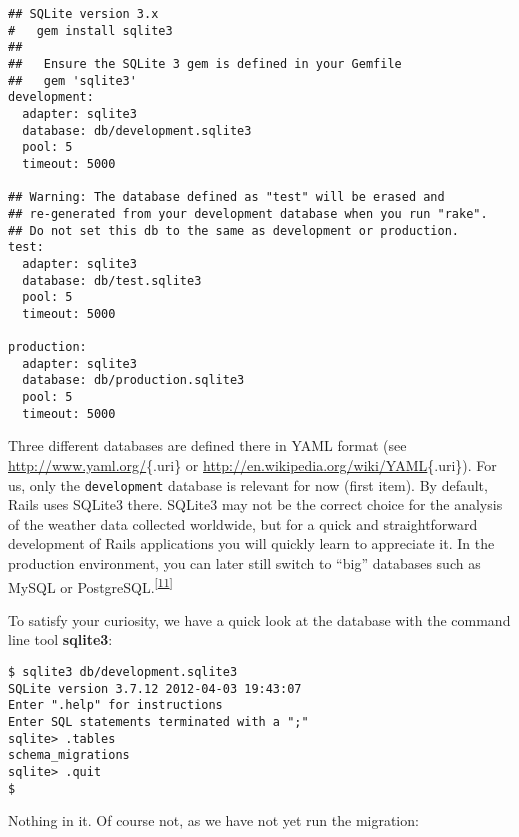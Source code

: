 \documentclass[a4paper]{book}
\newcounter{tab}[chapter]
\begin{document}
\begin{shaded}\begin{verbatim}
## SQLite version 3.x
#   gem install sqlite3
##
##   Ensure the SQLite 3 gem is defined in your Gemfile
##   gem 'sqlite3'
development:
  adapter: sqlite3
  database: db/development.sqlite3
  pool: 5
  timeout: 5000

## Warning: The database defined as "test" will be erased and
## re-generated from your development database when you run "rake".
## Do not set this db to the same as development or production.
test:
  adapter: sqlite3
  database: db/test.sqlite3
  pool: 5
  timeout: 5000

production:
  adapter: sqlite3
  database: db/production.sqlite3
  pool: 5
  timeout: 5000
\end{verbatim}\end{shaded}

Three different databases are defined there in YAML format (see \url{http://www.yaml.org/}\{.uri\} or \url{http://en.wikipedia.org/wiki/YAML}\{.uri\}). For us, only the \texttt{development} database is relevant for now (first item). By default, Rails uses SQLite3 there. SQLite3 may not be the correct choice for the analysis of the weather data collected worldwide, but for a quick and straightforward development of Rails applications you will quickly learn to appreciate it. In the production environment, you can later still switch to “big” databases such as MySQL or PostgreSQL.\textsuperscript{{[}\hyperref[ftn.idp5093968]{11}{]}}

To satisfy your curiosity, we have a quick look at the database with the command line tool \textbf{sqlite3}:

\begin{shaded}\begin{verbatim}
$ sqlite3 db/development.sqlite3
SQLite version 3.7.12 2012-04-03 19:43:07
Enter ".help" for instructions
Enter SQL statements terminated with a ";"
sqlite> .tables
schema_migrations
sqlite> .quit
$
\end{verbatim}\end{shaded}

Nothing in it. Of course not, as we have not yet run the migration:
\end{document}
